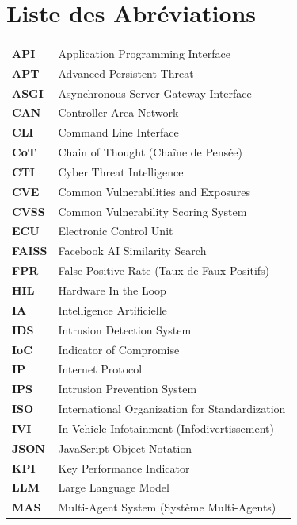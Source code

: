 \documentclass[a4paper, 12pt]{report}
\begin{document}
\newpage
\chapter*{Liste des Abréviations}

\begin{tabular}{ll}
\textbf{API} & Application Programming Interface \\
\textbf{APT} & Advanced Persistent Threat \\
\textbf{ASGI} & Asynchronous Server Gateway Interface \\
\textbf{CAN} & Controller Area Network \\
\textbf{CLI} & Command Line Interface \\
\textbf{CoT} & Chain of Thought (Chaîne de Pensée) \\
\textbf{CTI} & Cyber Threat Intelligence \\
\textbf{CVE} & Common Vulnerabilities and Exposures \\
\textbf{CVSS} & Common Vulnerability Scoring System \\
\textbf{ECU} & Electronic Control Unit \\
\textbf{FAISS} & Facebook AI Similarity Search \\
\textbf{FPR} & False Positive Rate (Taux de Faux Positifs) \\
\textbf{HIL} & Hardware In the Loop \\
\textbf{IA} & Intelligence Artificielle \\
\textbf{IDS} & Intrusion Detection System \\
\textbf{IoC} & Indicator of Compromise \\
\textbf{IP} & Internet Protocol \\
\textbf{IPS} & Intrusion Prevention System \\
\textbf{ISO} & International Organization for Standardization \\
\textbf{IVI} & In-Vehicle Infotainment (Infodivertissement) \\
\textbf{JSON} & JavaScript Object Notation \\
\textbf{KPI} & Key Performance Indicator \\
\textbf{LLM} & Large Language Model \\
\textbf{MAS} & Multi-Agent System (Système Multi-Agents) \\

\end{tabular}
\end{document}
